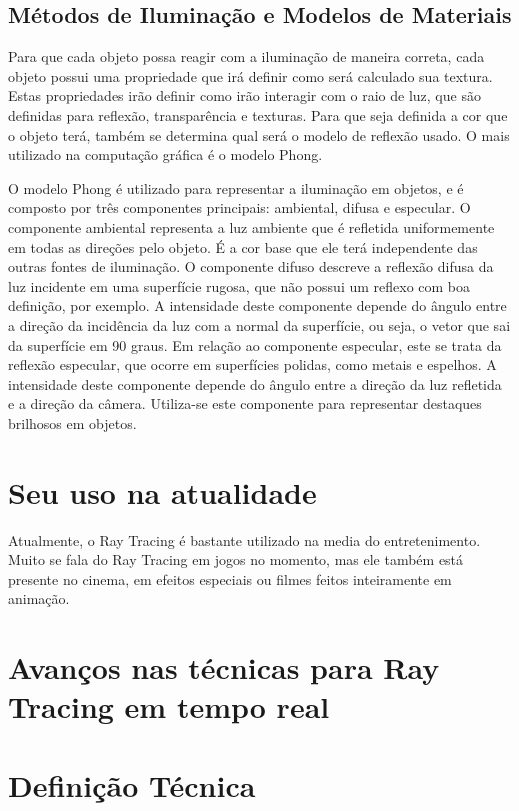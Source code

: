\documentclass[journal]{IEEEtran}
\begin{document}
\subsection{Métodos de Iluminação e Modelos de Materiais}
Para que cada objeto possa reagir com a iluminação de maneira correta, cada objeto
possui uma propriedade que irá definir como será calculado sua textura. Estas propriedades
irão definir como irão interagir com o raio de luz, que são definidas para reflexão,
transparência e texturas. Para que seja definida a cor que o objeto terá, também se
determina qual será o modelo de reflexão usado. O mais utilizado na computação gráfica
é o modelo Phong.

O modelo Phong é utilizado para representar a iluminação em objetos, e é composto por
três componentes principais: ambiental, difusa e especular. O componente ambiental 
representa a luz ambiente que é refletida uniformemente em todas as direções pelo objeto.
É a cor base que ele terá independente das outras fontes de iluminação. O componente 
difuso descreve a reflexão difusa da luz incidente em uma superfície rugosa, que não
possui um reflexo com boa definição, por exemplo. A intensidade deste componente depende
do ângulo entre a direção da incidência da luz com a normal da superfície, ou seja, o 
vetor que sai da superfície em 90 graus. Em relação ao componente especular, este se 
trata da reflexão especular, que ocorre em superfícies polidas, como metais e espelhos.
A intensidade deste componente depende do ângulo entre a direção da luz refletida e a 
direção da câmera. Utiliza-se este componente para representar destaques brilhosos em
objetos.

\section{Seu uso na atualidade}
Atualmente, o Ray Tracing é bastante utilizado na media do entretenimento. Muito se 
fala do Ray Tracing em jogos no momento, mas ele também está presente no cinema, em
efeitos especiais ou filmes feitos inteiramente em animação.

\section{Avanços nas técnicas para Ray Tracing em tempo real}

\section{Definição Técnica}
\end{document}
